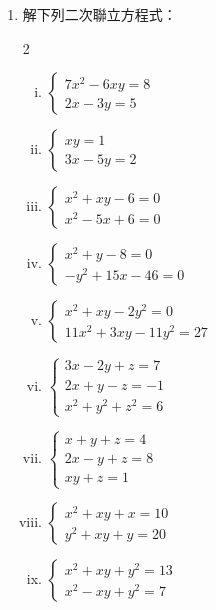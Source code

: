 \begin{enumerate}
  \item 解下列二次聯立方程式：
  \begin{multicols}{2}
  \begin{enumerate}[(i)]
    \item $\begin{cases}
    7x^2-6xy=8 \\
    2x-3y=5
    \end{cases}$

    \item $\begin{cases}
    xy=1 \\
    3x-5y=2
    \end{cases}$

    \item $\begin{cases}
    x^2+xy-6=0 \\
    x^2-5x+6=0
    \end{cases}$

    \item $\begin{cases}
    x^2+y-8=0 \\
    -y^2+15x-46=0
    \end{cases}$

    \item $\begin{cases}
    x^2+xy-2y^2=0 \\
    11x^2+3xy-11y^2=27
    \end{cases}$

    \item $\begin{cases}
    3x-2y+z=7 \\
    2x+y-z=-1 \\
    x^2+y^2+z^2=6
    \end{cases}$

    \item $\begin{cases}
    x+y+z=4 \\
    2x-y+z=8 \\
    xy+z=1
    \end{cases}$

    \item $\begin{cases}
    x^2+xy+x=10 \\
    y^2+xy+y=20
    \end{cases}$

    \item $\begin{cases}
    x^2+xy+y^2=13 \\
    x^2-xy+y^2=7
    \end{cases}$


\end{enumerate}
\end{multicols}
\end{enumerate}
